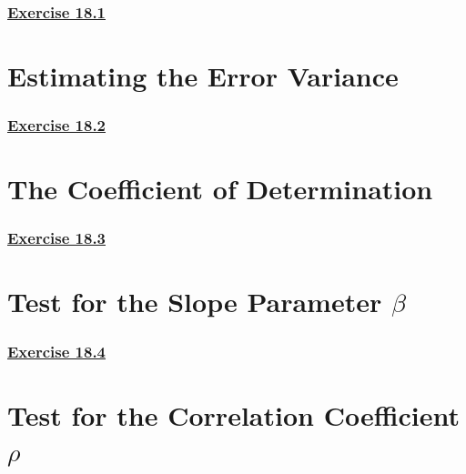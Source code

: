 \documentclass[
  11pt,
]{book}
\begin{document}
\subsubsection*{\texorpdfstring{\hyperref[ex181a]{Exercise 18.1}}{Exercise 18.1}}\label{exercise-18.1}

\section{Estimating the Error Variance}\label{estimating-the-error-variance}

\subsubsection*{\texorpdfstring{\hyperref[ex182a]{Exercise 18.2}}{Exercise 18.2}}\label{exercise-18.2}

\section{The Coefficient of Determination}\label{the-coefficient-of-determination}

\subsubsection*{\texorpdfstring{\hyperref[ex183a]{Exercise 18.3}}{Exercise 18.3}}\label{exercise-18.3}

\section{\texorpdfstring{Test for the Slope Parameter \(\beta\)}{Test for the Slope Parameter \textbackslash beta}}\label{test-for-the-slope-parameter-beta}

\subsubsection*{\texorpdfstring{\hyperref[ex184a]{Exercise 18.4}}{Exercise 18.4}}\label{exercise-18.4}

\section{\texorpdfstring{Test for the Correlation Coefficient \(\rho\)}{Test for the Correlation Coefficient \textbackslash rho}}\label{test-for-the-correlation-coefficient-rho}
\end{document}
